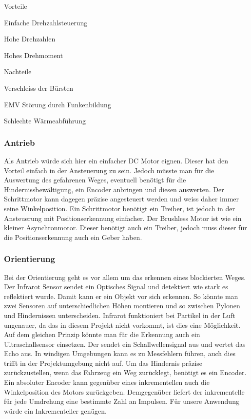\begin{minipage}[t]{0.48\textwidth}
\begin{items}
  \item [Vorteile]
  \item Einfache Drehzahlsteuerung
  \item Hohe Drehzahlen
  \item Hohes Drehmoment
\end{items}
\end{minipage}
\hfill
\begin{minipage}[t]{0.48\textwidth}
\begin{items}
  \item [Nachteile]
  \item Verschleiss der Bürsten
  \item EMV Störung durch Funkenbildung
  \item Schlechte Wärmeabführung
\end{items}
\end{minipage}



\subsubsection{Antrieb}
Als Antrieb würde sich hier ein einfacher DC Motor eignen. Dieser hat den Vorteil einfach in der Ansteuerung zu sein. Jedoch müsste man für die Auswertung des gefahrenen Weges, eventuell benötigt für die Hindernissbewältigung, ein Encoder anbringen und diesen auswerten. Der Schrittmotor kann dagegen präzise angesteuert werden und weiss daher immer seine Winkelposition. Ein Schrittmotor benötigt ein Treiber, ist jedoch in der Ansteuerung mit Positionserkennung einfacher. Der Brushless Motor ist wie ein kleiner Asynchronmotor. Dieser benötigt auch ein Treiber, jedoch muss dieser für die Positionserkennung auch ein Geber haben.

\subsubsection{Orientierung}
Bei der Orientierung geht es vor allem um das erkennen eines blockierten Weges. Der Infrarot Sensor sendet ein Optisches Signal und detektiert wie stark es reflektiert wurde. Damit kann er ein Objekt vor sich erkennen. So könnte man zwei Sensoren auf unterschiedlichen Höhen montieren und so zwischen Pylonen und Hindernissen unterscheiden. Infrarot funktioniert bei Partikel in der Luft ungenauer, da das in diesem Projekt nicht vorkommt, ist dies eine Möglichkeit. Auf dem gleichen Prinzip könnte man für die Erkennung auch ein Ultraschallsensor einsetzen. Der sendet ein Schallwellensignal aus und wertet das Echo aus. In windigen Umgebungen kann es zu Messfehlern führen, auch dies trifft in der Projektumgebung nicht auf. Um das Hindernis präzise zurückzustellen, wenn das Fahrzeug ein Weg zurücklegt, benötigt es ein Encoder. Ein absoluter Encoder kann gegenüber eines inkrementellen auch die Winkelposition des Motors zurückgeben. Demgegenüber liefert der inkrementelle für jede Umdrehung eine bestimmte Zahl an Impulsen. Für unsere Anwendung würde ein Inkrementeller genügen. 

